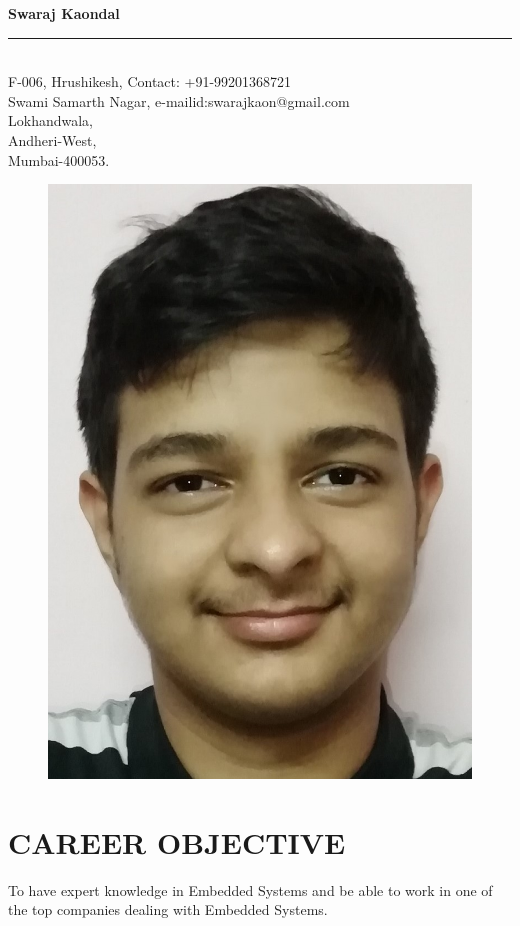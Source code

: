 \documentclass{article}
\begin{document}
\centerline{\Large{\textbf{Swaraj Kaondal}}}
\noindent\rule{\textwidth}{1pt}\\
F-006, Hrushikesh,\hfill
Contact:\hspace{0.8cm} +91-99201368721     \\
Swami Samarth Nagar,\hfill
e-mailid:swarajkaon@gmail.com\\
Lokhandwala,\\
Andheri-West,\\
Mumbai-400053.
\begin{figure}[h]
\hfill
\includegraphics[scale = 0.08]{Swaraj.jpg}
\end{figure}
\section*{\textbf{CAREER OBJECTIVE}}
\noindent To have expert knowledge in Embedded Systems and be able to work in one of the top companies dealing with Embedded Systems.
\end{document}
